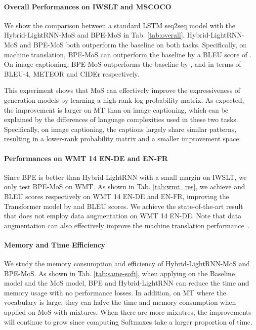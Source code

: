 \documentclass[letterpaper]{article} \usepackage{aaai19}  \usepackage{times}  \usepackage{helvet}  \usepackage{courier}  \usepackage{url}  \usepackage{graphicx}  \frenchspacing  \usepackage{booktabs}
\begin{document}
\paragraph{Overall Performances on IWSLT and MSCOCO} We show the comparison between a standard LSTM seq2seq model with the Hybrid-LightRNN-MoS and BPE-MoS in Tab. \ref{tab:overall}. Hybrid-LightRNN-MoS and BPE-MoS both outperform the baseline on both tasks. Specifically, on machine translation, BPE-MoS can outperform the baseline by a BLEU score of . On image captioning, BPE-MoS outperforms the baseline by ,  and  in terms of BLEU-4, METEOR and CIDEr respectively. 

This experiment shows that MoS can effectively improve the expressiveness of generation models by learning a high-rank log probability matrix.
As expected, the improvement is larger on MT than on image captioning, which can be explained by the differences of language complexities used in these two tasks. 
Specifically, on image captioning, the captions largely share similar patterns, resulting in a lower-rank probability matrix and a smaller improvement space. 

\paragraph{Performances on WMT 14 EN-DE and EN-FR} Since BPE is better than Hybrid-LightRNN with a small margin on IWSLT, we only test BPE-MoS on WMT. As shown in Tab. \ref{tab:wmt_res}, we achieve  and  BLEU scores respectively on WMT 14 EN-DE and EN-FR, improving the Transformer model by  and  BLEU scores. We achieve the state-of-the-art result that does not employ data augmentation on WMT 14 EN-DE. Note that data augmentation can also effectively improve the machine translation performance~\cite{edunov2018understanding}.

\paragraph{Memory and Time Efficiency} We study the memory consumption and efficiency of Hybrid-LightRNN-MoS and BPE-MoS.
As shown in Tab. \ref{tab:same-soft}, when applying on the Baseline model and the MoS model, BPE and Hybrid-LightRNN can reduce the time and memory usage with no performance losses. In addition, on MT where the vocabulary is large, they can halve the time and memory consumption when applied on MoS with  mixtures. When there are more mixutres, the improvements will continue to grow since computing Softmaxes take a larger proportion of time. 
\end{document}
